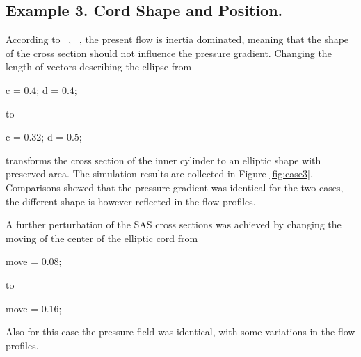 \subsection{Example 3. Cord Shape and Position.} 

According to ~\cite{Loth2001}, ~\cite{Alperin2006}, the present flow is inertia dominated, meaning that the shape of the cross section should not influence the pressure gradient. Changing the length of vectors describing the ellipse from
\begin{code}
c = 0.4;
d = 0.4;
\end{code}
to
\begin{code}
c = 0.32;
d = 0.5;
\end{code}
transforms the cross section of the inner cylinder to an elliptic shape with preserved area. The simulation results are collected in Figure \ref{fig:case3}. Comparisons showed that the pressure gradient was identical for the two cases, the different shape is however reflected in the flow profiles.


A further perturbation of the SAS cross sections was achieved by changing the moving of the center of the elliptic cord from
\begin{code}
move = 0.08;
\end{code}
to
\begin{code}
move = 0.16;
\end{code}
Also for this case the pressure field was identical, with some variations in the flow profiles.



